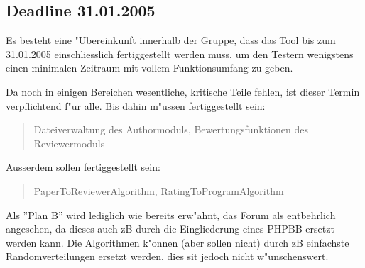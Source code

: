 \documentclass{article}
\begin{document}
\subsection*{Deadline 31.01.2005}
Es besteht eine "Ubereinkunft innerhalb der Gruppe, dass das Tool bis zum
31.01.2005 einschliesslich fertiggestellt werden muss, um den Testern
wenigstens einen minimalen Zeitraum mit vollem Funktionsumfang zu geben.

Da noch in einigen Bereichen wesentliche, kritische Teile fehlen, ist
dieser Termin verpflichtend f"ur alle. Bis dahin m"ussen fertiggestellt
sein:\ 
\begin{quote}
  Dateiverwaltung des Authormoduls, Bewertungsfunktionen des Reviewermoduls
\end{quote} 
Ausserdem sollen fertiggestellt sein:
\begin{quote}
  PaperToReviewerAlgorithm, RatingToProgramAlgorithm
\end{quote}
  
  Als ''Plan B'' wird lediglich wie bereits erw"ahnt, das Forum als
  entbehrlich angesehen, da dieses auch zB durch die Eingliederung eines
  PHPBB ersetzt werden kann. Die Algorithmen k"onnen (aber sollen nicht)
  durch zB einfachste Randomverteilungen ersetzt werden, dies sit jedoch
  nicht w"unschenswert.
  
\end{document}
